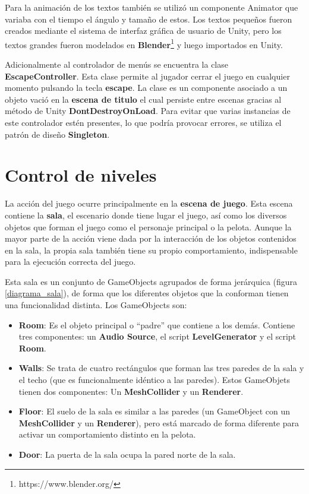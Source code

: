 Para la animación de los textos también se utilizó un componente Animator que variaba con el tiempo el ángulo y tamaño de estos. Los textos pequeños fueron creados mediante el sistema de interfaz gráfica de usuario de Unity, pero los textos grandes fueron modelados en \textbf{Blender}\footnote{https://www.blender.org/} y luego importados en Unity.

Adicionalmente al controlador de menús se encuentra la clase \textbf{EscapeController}. Esta clase permite al jugador cerrar el juego en cualquier momento pulsando la tecla \textbf{escape}. La clase es un componente asociado a un objeto vació en la \textbf{escena de titulo} el cual persiste entre escenas gracias al método de Unity \textbf{DontDestroyOnLoad}. Para evitar que varias instancias de este controlador estén presentes, lo que podría provocar errores, se utiliza el patrón de diseño \textbf{Singleton}.

\section{Control de niveles}
La acción del juego ocurre principalmente en la \textbf{escena de juego}. Esta escena contiene la \textbf{sala}, el escenario donde tiene lugar el juego, así como los diversos objetos que forman el juego como el personaje principal o la pelota. Aunque la mayor parte de la acción viene dada por la interacción de los objetos contenidos en la sala, la propia sala también tiene su propio comportamiento, indispensable para la ejecución correcta del juego.

Esta sala es un conjunto de GameObjects agrupados de forma jerárquica (figura \ref{diagrama_sala}), de forma que los diferentes objetos que la conforman tienen una funcionalidad distinta. Los GameObjects son:
\begin{itemize}
\item \textbf{Room}: Es el objeto principal o ``padre'' que contiene a los demás. Contiene tres componentes: un \textbf{Audio Source}, el script \textbf{LevelGenerator} y el script \textbf{Room}.
\item \textbf{Walls}: Se trata de cuatro rectángulos que forman las tres paredes de la sala y el techo (que es funcionalmente idéntico a las paredes). Estos GameObjets tienen dos componentes: Un \textbf{MeshCollider} y un \textbf{Renderer}.
\item \textbf{Floor}: El suelo de la sala es similar a las paredes (un GameObject con un \textbf{MeshCollider} y un \textbf{Renderer}), pero está marcado de forma diferente para activar un comportamiento distinto en la pelota.
\item \textbf{Door}: La puerta de la sala ocupa la pared norte de la sala. 
\end{itemize}

